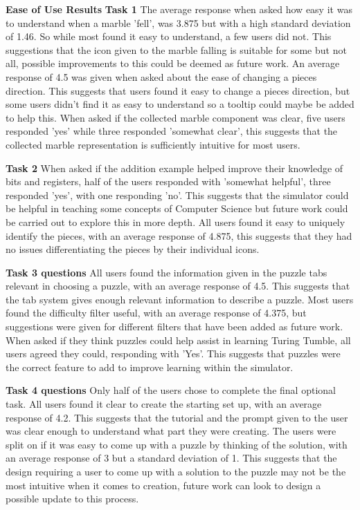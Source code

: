 \documentclass{l4proj}
\begin{document}
\textbf{Ease of Use Results}
\textbf{Task 1}
The average response when asked how easy it was to understand when a marble 'fell', was 3.875 but with a high standard deviation of 1.46. So while most found it easy to understand, a few users did not. This suggestions that the icon given to the marble falling is suitable for some but not all, possible improvements to this could be deemed as future work. An average response of 4.5 was given when asked about the ease of changing a pieces direction. This suggests that users found it easy to change a pieces direction, but some users didn't find it as easy to understand so a tooltip could maybe be added to help this. When asked if the collected marble component was clear, five users responded 'yes' while three responded 'somewhat clear', this suggests that the collected marble representation is sufficiently intuitive for most users.

\textbf{Task 2}
When asked if the addition example helped improve their knowledge of bits and registers, half of the users responded with 'somewhat helpful', three responded 'yes', with one responding 'no'. This suggests that the simulator could be helpful in teaching some concepts of Computer Science but future work could be carried out to explore this in more depth. All users found it easy to uniquely identify the pieces, with an average response of 4.875, this suggests that they had no issues differentiating the pieces by their individual icons.

\textbf{Task 3 questions}
All users found the information given in the puzzle tabs relevant in choosing a puzzle, with an average response of 4.5. This suggests that the tab system gives enough relevant information to describe a puzzle. Most users found the difficulty filter useful, with an average response of 4.375, but suggestions were given for different filters that have been added as future work. When asked if they think puzzles could help assist in learning Turing Tumble, all users agreed they could, responding with 'Yes'. This suggests that puzzles were the correct feature to add to improve learning within the simulator.

\textbf{Task 4 questions}
Only half of the users chose to complete the final optional task. All users found it clear to create the starting set up, with an average response of 4.2. This suggests that the tutorial and the prompt given to the user was clear enough to understand what part they were creating. The users were split on if it was easy to come up with a puzzle by thinking of the solution, with an average response of 3 but a standard deviation of 1. This suggests that the design requiring a user to come up with a solution to the puzzle may not be the most intuitive when it comes to creation, future work can look to design a possible update to this process.
\end{document}
